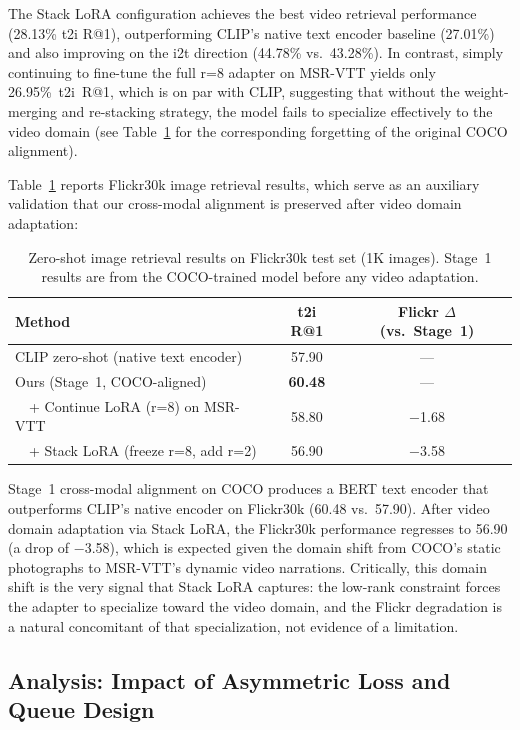 \documentclass[10pt,leqno]{amsart}
\begin{document}
The Stack LoRA configuration achieves the best video retrieval performance (28.13\% t2i R@1), outperforming CLIP's native text encoder baseline (27.01\%) and also improving on the i2t direction (44.78\% vs.~43.28\%). In contrast, simply continuing to fine-tune the full r=8 adapter on MSR-VTT yields only 26.95\%~t2i~R@1, which is on par with CLIP, suggesting that without the weight-merging and re-stacking strategy, the model fails to specialize effectively to the video domain (see Table~\ref{tab:flickr_results} for the corresponding forgetting of the original COCO alignment).

Table~\ref{tab:flickr_results} reports Flickr30k image retrieval results, which serve as an auxiliary validation that our cross-modal alignment is preserved after video domain adaptation:

\begin{table}[h]
\centering
\caption{Zero-shot image retrieval results on Flickr30k test set (1K images). Stage~1 results are from the COCO-trained model before any video adaptation.}
\label{tab:flickr_results}
\begin{tabular}{lcc}
\toprule
Method & t2i R@1 & Flickr $\Delta$ (vs.~Stage~1) \\
\midrule
CLIP zero-shot (native text encoder) & 57.90 & --- \\
Ours (Stage~1, COCO-aligned) & \textbf{60.48} & --- \\
~~+ Continue LoRA (r=8) on MSR-VTT & 58.80 & $-$1.68 \\
~~+ Stack LoRA (freeze r=8, add r=2) & 56.90 & $-$3.58 \\
\bottomrule
\end{tabular}
\end{table}

Stage~1 cross-modal alignment on COCO produces a BERT text encoder that outperforms CLIP's native encoder on Flickr30k (60.48 vs.~57.90). After video domain adaptation via Stack LoRA, the Flickr30k performance regresses to 56.90 (a drop of $-$3.58), which is expected given the domain shift from COCO's static photographs to MSR-VTT's dynamic video narrations. Critically, this domain shift is the very signal that Stack LoRA captures: the low-rank constraint forces the adapter to specialize toward the video domain, and the Flickr degradation is a natural concomitant of that specialization, not evidence of a limitation.

\subsection{Analysis: Impact of Asymmetric Loss and Queue Design}
\end{document}
